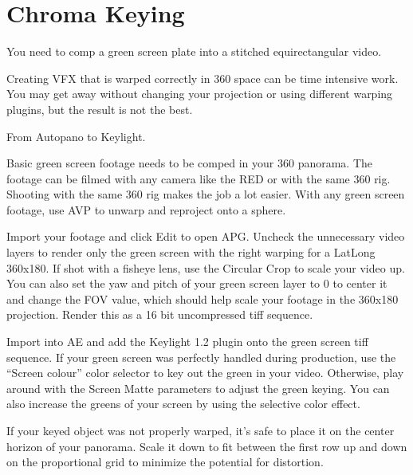 \chapter{Chroma Keying}
\pagecolor{white}
\label{chap:53}
\begin{fullwidth}

\problem

{\large You need to comp a green screen plate into a stitched equirectangular video. \par}

Creating VFX that is warped correctly in 360 space can be time intensive work. You may get away without changing your projection or using different warping plugins, but the result is not the best. 

\solution

{\large From Autopano to Keylight. \par}

Basic green screen footage needs to be comped in your 360 panorama. The footage can be filmed with any camera like the RED or with the same 360 rig. Shooting with the same 360 rig makes the job a lot easier. With any green screen footage, use AVP to unwarp and reproject onto a sphere. 


Import your footage and click Edit to open APG. Uncheck the unnecessary video layers to render only the green screen with the right warping for a LatLong 360x180. If shot with a fisheye lens, use the Circular Crop to scale your video up. You can also set the yaw and pitch of your green screen layer to 0 to center it and change the FOV value, which should help scale your footage in the 360x180 projection. Render this as a 16 bit uncompressed tiff sequence.


Import into AE and add the Keylight 1.2 plugin onto the green screen tiff sequence. If your green screen was perfectly handled during production, use the “Screen colour” color selector to key out the green in your video. Otherwise, play around with the Screen Matte parameters to adjust the green keying. You can also increase the greens of your screen by using the selective color effect.

\clearpage
If your keyed object was not properly warped, it's safe to place it on the center horizon of your panorama. Scale it down to fit between the first row up and down on the proportional grid to minimize the potential for distortion.


\end{fullwidth}
